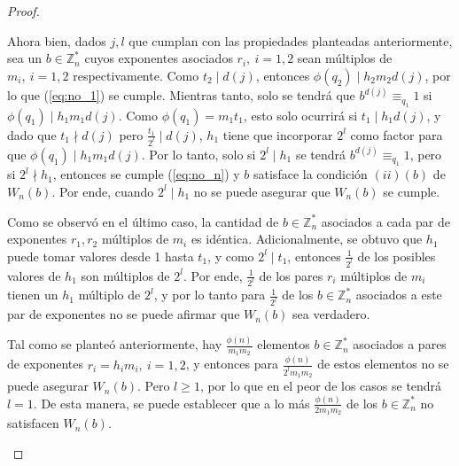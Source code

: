 \documentclass[hidelinks, 12pt]{article}
\newcommand{\Zs}{\mathbb{Z}^*}
\begin{document}
\begin{proof}
\begin{itemize}
        Ahora bien, dados $j,l$ que cumplan con las propiedades planteadas anteriormente, sea un $b\in\Zs_n$ cuyos exponentes asociados $r_i,~i=1,2$ sean múltiplos de $m_i,~i=1,2$ respectivamente. Como $t_2\mid d(j)$, entonces $\phi(q_2)\mid h_2m_2d(j)$, por lo que (\ref{eq:no_1}) se cumple. Mientras tanto, solo se tendrá que $b^{d(j)}\equiv_{q_1}1$ si $\phi(q_1)\mid h_1m_1d(j)$. Como $\phi(q_1)=m_1t_1$, esto solo ocurrirá si $t_1\mid h_1d(j)$, y dado que $t_1\nmid d(j)$ pero $\frac{t_1}{2^l}\mid d(j)$, $h_1$ tiene que incorporar $2^l$ como factor para que $\phi(q_1)\mid h_1m_1d(j)$. Por lo tanto, solo si $2^l\mid h_1$ se tendrá $b^{d(j)}\equiv_{q_1}1$, pero si $2^l\nmid h_1$, entonces se cumple (\ref{eq:no_n}) y $b$ satisface la condición $(ii)(b)$ de $W_n(b)$. Por ende, cuando $2^l\mid h_1$ no se puede asegurar que $W_n(b)$ se cumple.

        Como se observó en el último caso, la cantidad de $b\in\Zs_n$ asociados a cada par de exponentes $r_1,r_2$ múltiplos de $m_i$ es idéntica. Adicionalmente, se obtuvo que $h_1$ puede tomar valores desde 1 hasta $t_1$, y como $2^l\mid t_1$, entonces $\frac{1}{2^l}$ de los posibles valores de $h_1$ son múltiplos de $2^l$. Por ende, $\frac{1}{2^l}$ de los pares $r_i$ múltiplos de $m_i$ tienen un $h_1$ múltiplo de $2^l$, y por lo tanto para $\frac{1}{2^l}$ de los $b\in\Zs_n$ asociados a este par de exponentes no se puede afirmar que $W_n(b)$ sea verdadero.

        Tal como se planteó anteriormente, hay $\frac{\phi(n)}{m_1m_2}$ elementos $b\in\Zs_n$ asociados a pares de exponentes $r_i=h_im_i,~i=1,2$, y entonces para $\frac{\phi(n)}{2^lm_1m_2}$ de estos elementos no se puede asegurar $W_n(b)$. Pero $l\geq 1$, por lo que en el peor de los casos se tendrá $l=1$. De esta manera, se puede establecer que a lo más $\frac{\phi(n)}{2m_1m_2}$ de los $b\in\Zs_n$ no satisfacen $W_n(b)$.
    \end{itemize}
\end{proof}
\end{document}

